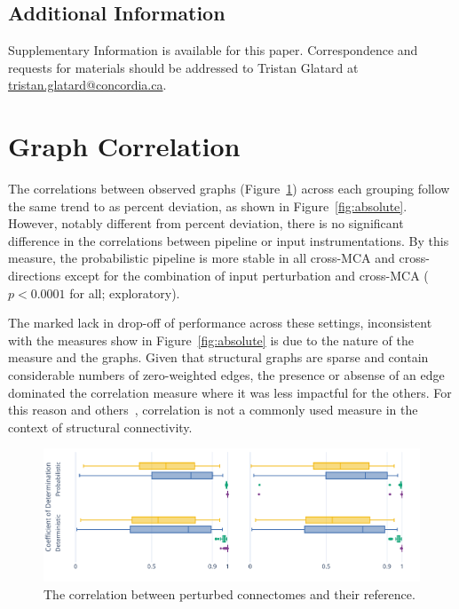 \documentclass[fleqn,10pt]{SelfArx} %
\begin{document}
\subsection*{Additional Information}
Supplementary Information is available for this paper. Correspondence and requests for materials should be addressed to
Tristan Glatard at \url{tristan.glatard@concordia.ca}.

\beginsupplement

\clearpage
\section{Graph Correlation}
\label{supsec:correlation}
The correlations between observed graphs (Figure~\ref{fig:correlation}) across each grouping follow the same trend to
as percent deviation, as shown in Figure~\ref{fig:absolute}. However, notably different from percent deviation, there
is no significant difference in the correlations between pipeline or input instrumentations. By this measure, the
probabilistic pipeline is more stable in all cross-MCA and cross-directions except for the combination of input
perturbation and cross-MCA ($p < 0.0001$ for all; exploratory).

The marked lack in drop-off of performance across these settings, inconsistent with the measures show in
Figure~\ref{fig:absolute} is due to the nature of the measure and the graphs. Given that structural graphs are sparse
and contain considerable numbers of zero-weighted edges, the presence or absense of an edge dominated the correlation
measure where it was less impactful for the others. For this reason and others~\cite{huang2016linking}, correlation is
not a commonly used measure in the context of structural connectivity.

\begin{figure}[ht]\centering
\includegraphics[width=\linewidth]{figures/figS1_correlation_differences.pdf}
\caption{The correlation between perturbed connectomes and their reference.}
\label{fig:correlation}
\end{figure}
\end{document}

